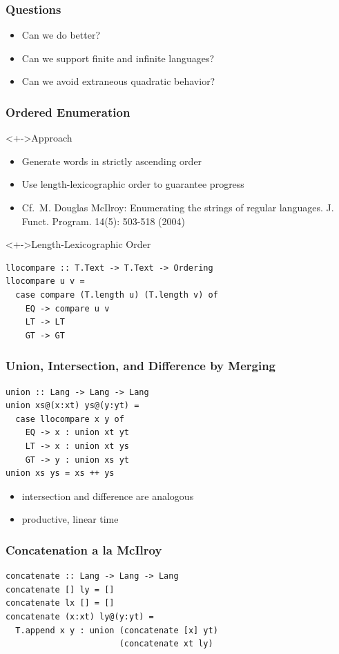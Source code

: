 \documentclass[pdftex]{beamer}
\begin{document}
\begin{frame}
  \frametitle{Questions}
  \begin{itemize}
  \item Can we do better?
  \item Can we support finite and infinite languages?
  \item Can we avoid extraneous quadratic behavior?
  \end{itemize}
\end{frame}
\begin{frame}[fragile]
  \frametitle{Ordered Enumeration}
  \vspace{-\baselineskip}
  \begin{block}<+->{Approach}
    \begin{itemize}
    \item Generate words in strictly ascending order
    \item Use length-lexicographic order to guarantee progress
    \item Cf.\ M. Douglas McIlroy:
      Enumerating the strings of regular languages. J. Funct. Program. 14(5): 503-518 (2004)
    \end{itemize}
  \end{block}
  \begin{block}<+->{Length-Lexicographic Order}
\begin{lstlisting}[numbers=none]
llocompare :: T.Text -> T.Text -> Ordering
llocompare u v =
  case compare (T.length u) (T.length v) of
    EQ -> compare u v
    LT -> LT
    GT -> GT
\end{lstlisting}
  \end{block}
\end{frame}
\begin{frame}
  \frametitle{Union, Intersection, and Difference by Merging}
\begin{lstlisting}[numbers=none]
union :: Lang -> Lang -> Lang
union xs@(x:xt) ys@(y:yt) =
  case llocompare x y of
    EQ -> x : union xt yt
    LT -> x : union xt ys
    GT -> y : union xs yt
union xs ys = xs ++ ys
\end{lstlisting}
  \begin{itemize}
  \item intersection and difference are analogous
  \item productive, linear time
  \end{itemize}
\end{frame}

\begin{frame}[fragile]
  \frametitle{Concatenation a la McIlroy}
\begin{lstlisting}[numbers=none]
concatenate :: Lang -> Lang -> Lang
concatenate [] ly = []
concatenate lx [] = []
concatenate (x:xt) ly@(y:yt) =
  T.append x y : union (concatenate [x] yt) 
                       (concatenate xt ly)
\end{lstlisting}
\end{frame}
\end{document}
